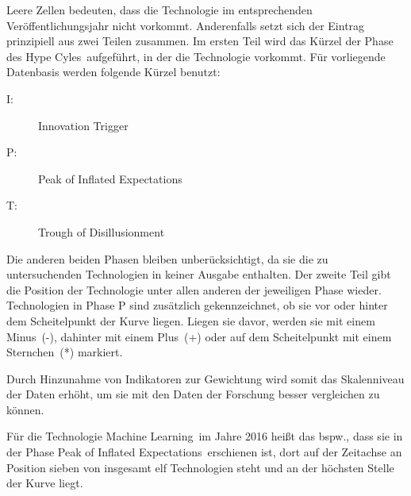 Leere Zellen bedeuten, dass die Technologie im entsprechenden Veröffentlichungsjahr nicht vorkommt. Anderenfalls setzt sich der Eintrag prinzipiell aus zwei Teilen zusammen. Im ersten Teil wird das Kürzel der Phase des \glqq Hype Cyles\grqq~aufgeführt, in der die Technologie vorkommt. Für vorliegende Datenbasis werden folgende Kürzel benutzt:

\begin{description}
	\item[\acs{I}:] Innovation Trigger
	\item[\acs{P}:] Peak of Inflated Expectations
	\item[\acs{T}:] Trough of Disillusionment
\end{description}

Die anderen beiden Phasen bleiben unberücksichtigt, da sie die zu untersuchenden Technologien in keiner Ausgabe enthalten. Der zweite Teil gibt die Position der Technologie unter allen anderen der jeweiligen Phase wieder. Technologien in Phase P sind zusätzlich gekennzeichnet, ob sie vor oder hinter dem Scheitelpunkt der Kurve liegen. Liegen sie davor, werden sie mit einem Minus~(-), dahinter mit einem Plus~(+) oder auf dem Scheitelpunkt mit einem Sternchen~(*) markiert.

Durch Hinzunahme von Indikatoren zur Gewichtung wird somit das Skalenniveau der Daten erhöht, um sie mit den Daten der Forschung besser vergleichen zu können.

Für die Technologie \glqq Machine Learning\grqq~im Jahre 2016 heißt das bspw., dass sie in der Phase \glqq Peak of Inflated Expectations\grqq~erschienen ist, dort auf der Zeitachse an Position sieben von insgesamt elf Technologien steht und an der höchsten Stelle der Kurve liegt.

